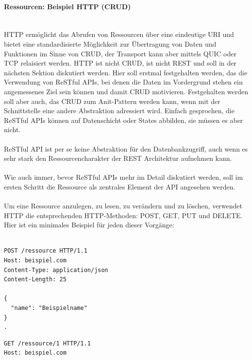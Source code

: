 \paragraph{Ressourcen: Beispiel HTTP (CRUD)\\\\}
HTTP ermöglicht das Abrufen von Ressourcen über eine eindeutige URI und bietet eine standardisierte Möglichkeit zur Übertragung von Daten und Funktionen im Sinne von CRUD, der Transport kann aber mittels QUIC oder TCP relaisiert werden. HTTP ist nicht CRUD, ist nicht REST und soll in der nächsten Sektion diskutiert werden. Hier soll erstmal festgehalten werden, das die Verwendung von ReSTful APIs, bei denen die Daten im Vordergrund stehen ein angemessenes Ziel sein können und damit CRUD motivieren. Festgehalten werden soll aber auch, das CRUD zum Anit-Pattern werden kann, wenn mit der Schnittstelle eine andere Abstraktion adressiert wird. Einfach gesprochen, die ReSTful APIs können auf Datenschicht  oder States abbilden, sie müssen es aber nicht.\\\\ 
ReSTful API ist per se keine Abstraktion für den Datenbankzugriff, auch wenn es sehr stark den Ressourcencharakter der REST Architektur aufnehmen kann.\\\\
Wie auch immer, bevor ReSTful APIs mehr im Detail diskutiert werden, soll im ersten Schritt die Ressource als zentrales Element der API angesehen werden.\\\\
Um eine Ressource anzulegen, zu lesen, zu verändern und zu löschen, verwendet HTTP die entsprechenden HTTP-Methoden: POST, GET, PUT und DELETE. Hier ist ein minimales Beispiel für jeden dieser Vorgänge:\\\\

\noindent\begin{minipage}{\textwidth}
\begin{lstlisting}[caption={Ressource anlegen (POST)},captionpos=b,label={lst:post}]
POST /ressource HTTP/1.1
Host: beispiel.com
Content-Type: application/json
Content-Length: 25

{
  "name": "Beispielname"
}
.
\end{lstlisting}
\end{minipage}

\noindent\begin{minipage}{\textwidth}
\begin{lstlisting}[caption={Ressource lesen (GET)},captionpos=b,label={lst:get}]
GET /ressource/1 HTTP/1.1
Host: beispiel.com
\end{lstlisting}
\end{minipage}

